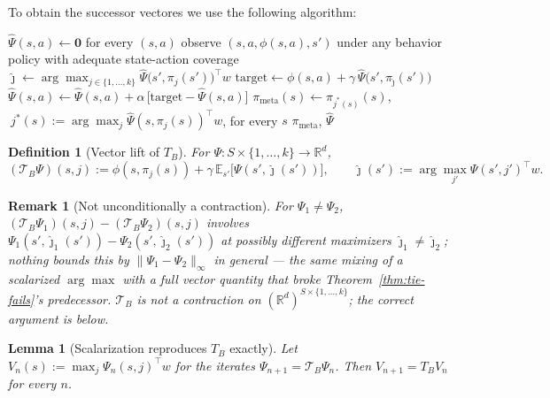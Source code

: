 \documentclass[11pt]{article}
\newtheorem{lemma}{Lemma}
\newtheorem{definition}{Definition}
\newtheorem{remark}{Remark}
\begin{document}
To obtain the successor vectores we use the following algorithm: 

\begin{algorithm}[H]
\caption{\textsc{MetaPolicyQL}$(\{\pi_1,\dots,\pi_k\},w)$ — metapolicy and its SF table, by sampling}
\begin{algorithmic}[1]
\State $\widehat\Psi(s,a) \gets \mathbf 0$ for every $(s,a)$
\Repeat
  \State observe $(s,a,\phi(s,a),s')$ under any behavior policy with adequate state-action coverage
  \State $\hat\jmath \gets \arg\max_{j\in\{1,\dots,k\}} \widehat\Psi\big(s',\pi_j(s')\big)^\top w$
  \State $\mathrm{target} \gets \phi(s,a) + \gamma\,\widehat\Psi\big(s',\pi_{\hat\jmath}(s')\big)$
  \State $\widehat\Psi(s,a) \gets \widehat\Psi(s,a) + \alpha\,\big[\mathrm{target}-\widehat\Psi(s,a)\big]$
\State $\pi_{\mathrm{meta}}(s) \gets \pi_{j^*(s)}(s)$, $\ j^*(s):=\arg\max_j\widehat\Psi(s,\pi_j(s))^\top w$, for every $s$
\State \Return $\pi_{\mathrm{meta}}$, $\widehat\Psi$
\end{algorithmic}
\end{algorithm}


\begin{definition}[Vector lift of $T_B$]\label{def:vecTB}
For $\Psi:S\times\{1,\dots,k\}\to\mathbb R^d$,
\[
(\mathcal T_B\Psi)(s,j) := \phi(s,\pi_j(s)) + \gamma\,\mathbb E_{s'}\big[\Psi(s',\hat\jmath(s'))\big],
\qquad \hat\jmath(s') := \arg\max_{j'}\Psi(s',j')^\top w.
\]
\end{definition}

\begin{remark}[Not unconditionally a contraction]\label{rem:notcontraction}
For $\Psi_1\ne\Psi_2$, $(\mathcal T_B\Psi_1)(s,j)-(\mathcal T_B\Psi_2)(s,j)$ involves
$\Psi_1(s',\hat\jmath_1(s'))-\Psi_2(s',\hat\jmath_2(s'))$ at possibly \emph{different} maximizers
$\hat\jmath_1\ne\hat\jmath_2$; nothing bounds this by $\|\Psi_1-\Psi_2\|_\infty$ in general — the same mixing of a
scalarized $\arg\max$ with a full vector quantity that broke Theorem~\ref{thm:tie-fails}'s predecessor. $\mathcal
T_B$ is \emph{not} a contraction on $(\mathbb R^d)^{S\times\{1,\dots,k\}}$; the correct argument is below.
\end{remark}

\begin{lemma}[Scalarization reproduces $T_B$ exactly]\label{lem:scalarization}
Let $V_n(s):=\max_j\Psi_n(s,j)^\top w$ for the iterates $\Psi_{n+1}=\mathcal T_B\Psi_n$. Then $V_{n+1}=T_BV_n$ for
every $n$.
\end{lemma}
\end{document}
